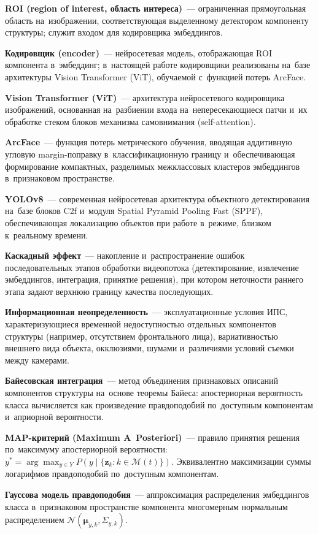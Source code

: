 \textbf{ROI (region of interest, область интереса)}~--- ограниченная
прямоугольная область на~изображении, соответствующая выделенному
детектором компоненту структуры; служит входом для кодировщика
эмбеддингов.

\textbf{Кодировщик (encoder)}~--- нейросетевая модель, отображающая
ROI компонента в~эмбеддинг; в~настоящей работе кодировщики реализованы
на~базе архитектуры Vision Transformer (ViT), обучаемой с~функцией потерь
ArcFace.

\textbf{Vision Transformer (ViT)}~--- архитектура нейросетевого
кодировщика изображений, основанная на~разбиении входа на~непересекающиеся
патчи и~их обработке стеком блоков механизма самовнимания (self-attention).

\textbf{ArcFace}~--- функция потерь метрического обучения, вводящая
аддитивную угловую margin-поправку в~классификационную границу
и~обеспечивающая формирование компактных, разделимых межклассовых
кластеров эмбеддингов в~признаковом пространстве.

\textbf{YOLOv8}~--- современная нейросетевая архитектура объектного
детектирования на~базе блоков C2f и~модуля Spatial Pyramid Pooling Fast
(SPPF), обеспечивающая локализацию объектов при работе в~режиме,
близком к~реальному времени.

\textbf{Каскадный эффект}~--- накопление и~распространение ошибок
последовательных этапов обработки видеопотока (детектирование,
извлечение эмбеддингов, интеграция, принятие решения),
при котором неточности раннего этапа задают верхнюю границу качества
последующих.

\textbf{Информационная неопределенность}~--- эксплуатационные условия
ИПС, характеризующиеся временной недоступностью отдельных компонентов
структуры (например, отсутствием фронтального лица), вариативностью
внешнего вида объекта, окклюзиями, шумами и~различиями условий съемки
между камерами.

\textbf{Байесовская интеграция}~--- метод объединения признаковых
описаний компонентов структуры на~основе теоремы Байеса:
апостериорная вероятность класса вычисляется как произведение
правдоподобий по~доступным компонентам и~априорной вероятности.

\textbf{MAP-критерий (Maximum A~Posteriori)}~--- правило принятия
решения по~максимуму апостериорной вероятности:
$y^{*}=\arg\max_{y\in Y} P(y\mid\{\mathbf{z}_k\colon k\in\mathcal{M}(t)\})$.
Эквивалентно максимизации суммы логарифмов правдоподобий по~доступным
компонентам.

\textbf{Гауссова модель правдоподобия}~--- аппроксимация распределения
эмбеддингов класса в~признаковом пространстве компонента многомерным
нормальным распределением $\mathcal{N}(\boldsymbol{\mu}_{y,k},\Sigma_{y,k})$.

